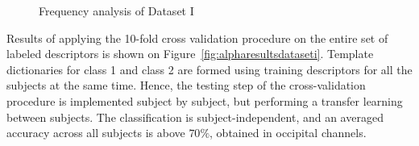 \begin{figure}[h!]
\centering
{}
\caption[Power Spectral Density of the Dataset I]{Frequency analysis of Dataset I}
\label{fig:psd}
\end{figure}
   
Results of applying the 10-fold cross validation procedure on the entire set of labeled descriptors is shown on Figure~\ref{fig:alpharesultsdataseti}. Template dictionaries for class 1 and class 2 are formed using training descriptors for all the subjects at the same time.  Hence, the testing step of the cross-validation procedure is implemented subject by subject, but performing a transfer learning between subjects. The classification is subject-independent, and an averaged accuracy across all subjects is above $70\%$, obtained in occipital channels.
   
